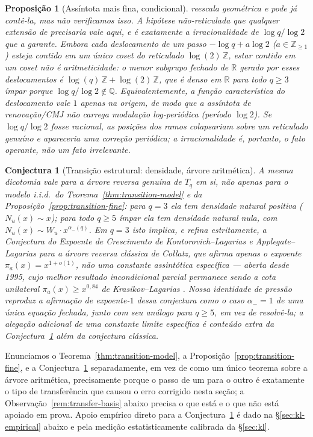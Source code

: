 \documentclass[11pt]{article}
\newtheorem{proposition}[theorem]{Proposição}
\newtheorem{conjecture}[theorem]{Conjectura}
\theoremstyle{definition}
\theoremstyle{remark}
\begin{document}
\begin{proposition}[Assíntota mais fina, condicional]
reescala geométrica e pode já contê-la, mas não verificamos isso. A
hipótese não-reticulada que qualquer extensão de \cite{Nerman1981}
precisaria vale aqui, e é exatamente a irracionalidade de $\log
q/\log2$ que a garante. Embora cada deslocamento de um passo $-\log q
+ a\log2$ ($a\in\mathbb{Z}_{\ge1}$) esteja contido em um único coset
do reticulado $\log(2)\,\mathbb{Z}$, estar contido em um coset não é
aritmeticidade: o menor subgrupo fechado de $\mathbb{R}$ gerado por
esses deslocamentos é $\log(q)\,\mathbb{Z}+\log(2)\,\mathbb{Z}$, que é
denso em $\mathbb{R}$ para todo $q\ge3$ ímpar porque $\log
q/\log2\notin\mathbb{Q}$. Equivalentemente, a função característica do
deslocamento vale $1$ apenas na origem, de modo que a assíntota de
renovação/CMJ não carrega modulação log-periódica (período $\log2$).
Se $\log q/\log2$ fosse racional, as posições dos ramos colapsariam
sobre um reticulado genuíno e apareceria uma correção periódica; a
irracionalidade é, portanto, o fato operante, não um fato
irrelevante.
\end{proposition}

\begin{conjecture}[Transição estrutural: densidade, árvore aritmética]\label{conj:transition-arithmetic}
A mesma dicotomia vale para a árvore reversa genuína de $T_q$ em si,
não apenas para o modelo i.i.d.\ do Teorema~\ref{thm:transition-model}
e da Proposição~\ref{prop:transition-fine}: para $q=3$ ela tem
densidade natural positiva ($N_u(x)\sim x$); para
todo $q\ge5$ ímpar ela tem densidade natural nula, com
$N_u(x)\sim W_u\cdot x^{\alpha_-(q)}$. Em $q=3$ isto \emph{implica, e
refina estritamente}, a Conjectura do Expoente de Crescimento de
Kontorovich--Lagarias \cite{KontorovichLagarias2009} e
Applegate--Lagarias
\cite{ApplegateLagarias1995I,ApplegateLagarias1995II} para a árvore
reversa clássica de Collatz, que afirma apenas o expoente
$\pi_a(x)=x^{1+o(1)}$, não uma constante assintótica específica ---
aberta desde 1995, cujo melhor resultado incondicional parcial
permanece sendo a cota unilateral $\pi_a(x)\ge x^{0{,}84}$ de
Krasikov--Lagarias \cite{KrasikovLagarias2003}. Nossa identidade de
pressão reproduz a afirmação de expoente-$1$ dessa conjectura como o
caso $\alpha_-=1$ de uma única equação fechada, junto com seu análogo
para $q\ge5$, em vez de resolvê-la; a alegação adicional de uma
constante limite específica é conteúdo extra da
Conjectura~\ref{conj:transition-arithmetic} além da conjectura
clássica.
\end{conjecture}

Enunciamos o Teorema~\ref{thm:transition-model}, a
Proposição~\ref{prop:transition-fine}, e a
Conjectura~\ref{conj:transition-arithmetic} separadamente, em vez de
como um único teorema sobre a árvore aritmética, precisamente porque o
passo de um para o outro é exatamente o tipo de transferência que
causou o erro corrigido nesta seção; a Observação~\ref{rem:transfer-basis}
abaixo precisa o que está e o que não está apoiado em prova. Apoio
empírico direto para a Conjectura~\ref{conj:transition-arithmetic} é
dado na \S\ref{sec:kl-empirical} abaixo e pela medição estatisticamente
calibrada da \S\ref{sec:kl}.
\end{document}
